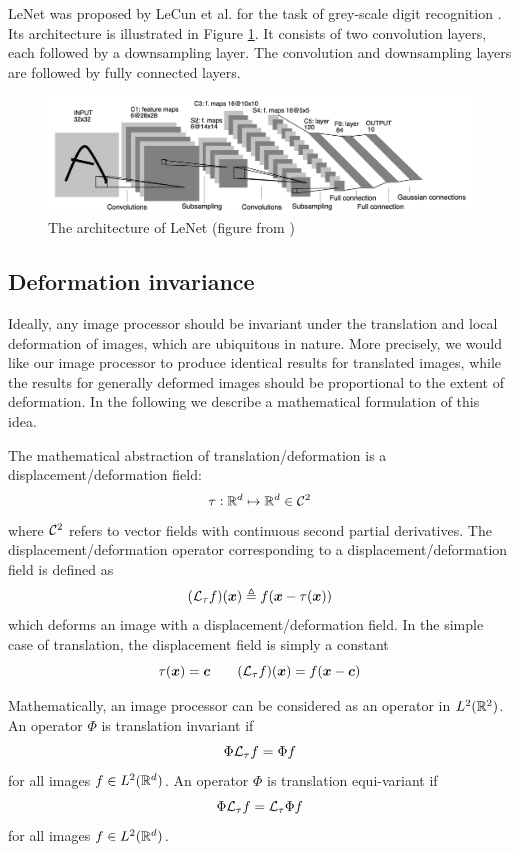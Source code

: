 \documentclass{article}
\begin{document}
LeNet was proposed by LeCun et al. for the task of grey-scale digit recognition \cite{lecun1998gradient}.
Its architecture is illustrated in Figure \ref{lenet}.
It consists of two convolution layers, each followed by a downsampling layer.
The convolution and downsampling layers are followed by fully connected layers.

\begin{figure}
\includegraphics[scale=0.1]{lenet}
\caption{The architecture of LeNet (figure from \cite{lecun1998gradient})}
\label{lenet}
\end{figure}

\subsection{Deformation invariance}

Ideally, any image processor should be invariant under the translation and local deformation of images, which are ubiquitous in nature.
More precisely, we would like our image processor to produce identical results for translated images, while the results for generally deformed images should be proportional to the extent of deformation.
In the following we describe a mathematical formulation of this idea.

The mathematical abstraction of translation/deformation is a displacement/deformation field:
\[
\tau: {\mathbb R}^d \mapsto {\mathbb R}^d \in {\mathcal C}^2
\]
where ${\mathcal C}^2$ refers to vector fields with continuous second partial derivatives.
The displacement/deformation operator corresponding to a displacement/deformation field is defined as
\[
({\mathcal L}_\tau f) ({\bm x}) \triangleq f({\bm x} - \tau ({\bm x}))
\]
which deforms an image with a displacement/deformation field.
In the simple case of translation, the displacement field is simply a constant
\[
\tau ({\bm x}) = {\bm c} \qquad
({\mathcal L}_\tau f) ({\bm x}) = f({\bm x} - {\bm c})
\]

Mathematically, an image processor can be considered as an operator in $L^2 ({\mathbb R}^2)$.
An operator $\Phi$ is translation invariant if
\[
\Phi {\mathcal L}_\tau f = \Phi f
\]
for all images $f \in L^2 ({\mathbb R}^d)$.
An operator $\Phi$ is translation equi-variant if
\[
\Phi {\mathcal L}_\tau f = {\mathcal L}_\tau \Phi f
\]
for all images $f \in L^2 ({\mathbb R}^d)$.
\end{document}
